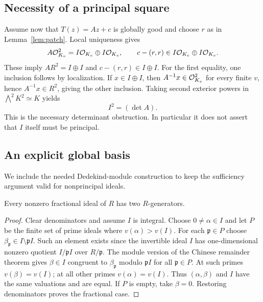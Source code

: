 \subsection{Necessity of a principal square}
Assume now that $T(z)=Az+c$ is globally good and choose $r$ as in
Lemma~\ref{lem:patch}. Local uniqueness gives
\begin{equation}\label{eq:localmodule}
 A\mathcal O_{K_v}^2=I\mathcal O_{K_v}\oplus I\mathcal O_{K_v},\qquad
 c-(r,r)\in I\mathcal O_{K_v}\oplus I\mathcal O_{K_v}.
\end{equation}
These imply $AR^2=I\oplus I$ and $c-(r,r)\in I\oplus I$.
For the first equality, one inclusion follows by localization.
If $x\in I\oplus I$, then $A^{-1}x\in\mathcal O_{K_v}^2$ for every
finite $v$, hence $A^{-1}x\in R^2$, giving the other inclusion.
Taking second exterior powers in $\bigwedge^2K^2\simeq K$ yields
\begin{equation}\label{eq:detideal}
 I^2=(\det A).
\end{equation}
This is the necessary determinant obstruction. In particular it
does not assert that $I$ itself must be principal.

\subsection{An explicit global basis}
We include the needed Dedekind-module construction to keep the
sufficiency argument valid for nonprincipal ideals.

\begin{lemma}\label{lem:twogen}
Every nonzero fractional ideal of $R$ has two $R$-generators.
\end{lemma}
\begin{proof}
Clear denominators and assume $I$ is integral. Choose
$0\ne\alpha\in I$ and let $P$ be the finite set of prime ideals
where $v(\alpha)>v(I)$. For each $\mathfrak p\in P$ choose
$\beta_{\mathfrak p}\in I\setminus\mathfrak p I$.
Such an element exists since the invertible ideal $I$ has
one-dimensional nonzero quotient $I/\mathfrak p I$ over
$R/\mathfrak p$. The module version of the Chinese remainder
theorem gives $\beta\in I$ congruent to
$\beta_{\mathfrak p}$ modulo $\mathfrak p I$ for all
$\mathfrak p\in P$. At such primes $v(\beta)=v(I)$; at all
other primes $v(\alpha)=v(I)$. Thus $(\alpha,\beta)$ and $I$
have the same valuations and are equal. If $P$ is empty, take
$\beta=0$. Restoring denominators proves the fractional case.
\end{proof}

